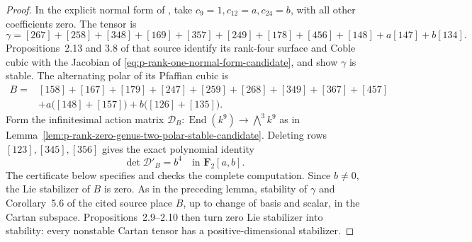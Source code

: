 \begin{proof}
In the explicit normal form of
\citet[Proposition~2.1]{RainsSam2018Trivectors}, take
$c_9=1,c_{12}=a,c_{24}=b$, with all other coefficients zero. The tensor is
\[
 \gamma=[267]+[258]+[348]+[169]+[357]+[249]+[178]+[456]
                         +[148]+a[147]+b[134].
\]
Propositions~2.13 and 3.8 of that source identify its rank-four
surface and Coble cubic with the Jacobian of
\eqref{eq:p-rank-one-normal-form-candidate}, and show $\gamma$ is stable.
The alternating polar of its Pfaffian cubic is
\begin{align*}
 B={}&[158]+[167]+[179]+[247]+[259]+[268]+[349]+[367]+[457]\\
    &+a\bigl([148]+[157]\bigr)+b\bigl([126]+[135]\bigr).
\end{align*}
Form the infinitesimal action matrix
$\mathcal D_B:\operatorname{End}(k^9)\to\bigwedge^3k^9$ as in
Lemma~\ref{lem:p-rank-zero-genus-two-polar-stable-candidate}.
Deleting rows $[123],[345],[356]$ gives the exact polynomial identity
\begin{equation}\label{eq:p-rank-one-polar-minor-candidate}
                         \det\mathcal D'_B=b^4
                        \quad\text{in }\mathbf F_2[a,b].
\end{equation}
The certificate below specifies and checks the complete computation.
Since $b\ne0$, the Lie stabilizer of $B$ is zero. As in the preceding
lemma, stability of $\gamma$ and Corollary~5.6 of the cited source
place $B$, up to change of basis and scalar, in the Cartan subspace.
Propositions~2.9--2.10 then turn zero Lie stabilizer into stability:
every nonstable Cartan tensor has a positive-dimensional stabilizer.
\end{proof}

